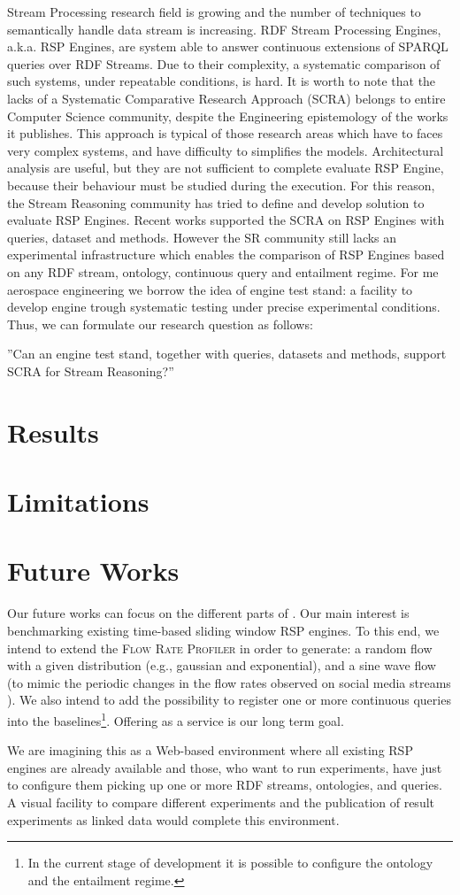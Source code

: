 Stream Processing research field is growing and the number of techniques to semantically handle data stream is increasing. RDF Stream Processing Engines, a.k.a. RSP Engines, are system able to answer continuous extensions of SPARQL queries over RDF Streams. Due to their complexity, a systematic comparison of such systems, under repeatable conditions, is hard. It is worth to note that the lacks of a Systematic Comparative Research Approach (SCRA) belongs to entire Computer Science community, despite the Engineering epistemology of the works it publishes. This approach is typical of those research areas which have to faces very complex systems, and have difficulty to simplifies the models. Architectural analysis are useful, but they are not sufficient to complete evaluate RSP Engine, because their behaviour must be studied during the execution. For this reason, the Stream Reasoning community has tried to define and develop solution to evaluate RSP Engines. Recent works supported the SCRA on RSP Engines with queries, dataset and methods. However the SR community still lacks an experimental infrastructure which enables the comparison of RSP Engines based on any RDF stream, ontology, continuous query and entailment regime.  For me aerospace engineering we borrow the idea of engine test stand: a facility to develop engine trough systematic testing under precise experimental conditions. Thus, we can formulate our research question as follows:

”Can an engine test stand, together with queries, datasets and methods, support SCRA for Stream Reasoning?”


\section{Results}
\section{Limitations}
\section{Future Works}

Our future works can focus on the different parts of \name. Our main interest is benchmarking existing time-based sliding window RSP engines. To this end, we intend to extend the \textsc{Flow Rate Profiler} in order to generate: a random flow with a given distribution (e.g., gaussian and exponential), and a sine wave flow (to mimic the periodic changes in the flow rates observed on social media streams \cite{DBLP:conf/semweb/BalduiniVDTPC13}). We also intend to add the possibility to register one or more continuous queries into the baselines\footnote{In the current stage of development it is possible to configure the ontology and the entailment regime.}. Offering \name as a service is our long term goal. 

We are imagining  this as a Web-based environment where all existing RSP engines are already available and those, who want to run experiments, have just to configure them picking up one or more RDF streams, ontologies, and queries. A visual facility to compare different experiments and the publication of result experiments as linked data would complete this environment.
